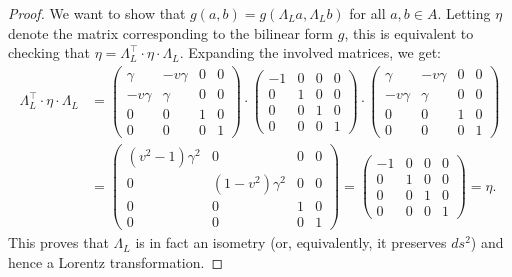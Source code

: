 \documentclass{../../templates/lkx_pset}
\begin{document}
\begin{solution}
	\begin{proof}
		We want to show that $g(a,b) = g(\Lambda_{L}a, \Lambda_{L} b)$ for all $a,b\in A$. Letting $\eta$ denote the matrix corresponding to the bilinear form $g$, this is equivalent to checking that $\eta = \Lambda_{L}^\intercal \cdot \eta\cdot \Lambda_L$. Expanding the involved matrices, we get:
		\[
			\begin{aligned}
				\Lambda_L^\intercal\cdot \eta \cdot \Lambda_L
				 & =
				\begin{pmatrix}
					\gamma   & -v\gamma & 0 & 0 \\
					-v\gamma & \gamma   & 0 & 0 \\
					0        & 0        & 1 & 0 \\
					0        & 0        & 0 & 1
				\end{pmatrix}
				\cdot
				\begin{pmatrix}
					-1 & 0 & 0 & 0 \\
					0  & 1 & 0 & 0 \\
					0  & 0 & 1 & 0 \\
					0  & 0 & 0 & 1
				\end{pmatrix}
				\cdot
				\begin{pmatrix}
					\gamma   & -v\gamma & 0 & 0 \\
					-v\gamma & \gamma   & 0 & 0 \\
					0        & 0        & 1 & 0 \\
					0        & 0        & 0 & 1
				\end{pmatrix} \\
				 & =
				\begin{pmatrix}
					(v^2-1)\gamma^2 & 0               & 0 & 0 \\
					0               & (1-v^2)\gamma^2 & 0 & 0 \\
					0               & 0               & 1 & 0 \\
					0               & 0               & 0 & 1
				\end{pmatrix}
				=
				\begin{pmatrix}
					-1 & 0 & 0 & 0 \\
					0  & 1 & 0 & 0 \\
					0  & 0 & 1 & 0 \\
					0  & 0 & 0 & 1
				\end{pmatrix} = \eta.
			\end{aligned}
		\]
		This proves that $\Lambda_L$ is in fact an isometry (or, equivalently, it preserves $ds^2$) and hence a Lorentz transformation.
	\end{proof}
\end{solution}
\end{document}
